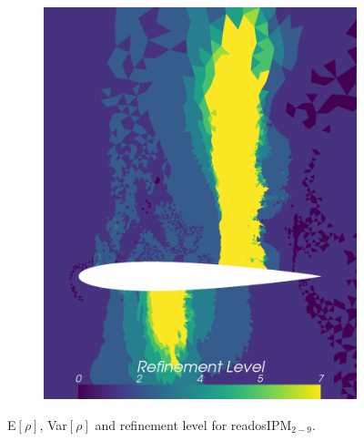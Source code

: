 \begin{figure}[h!]
\begin{subfigure}{0.329\linewidth}
		\includegraphics[width=\linewidth]{figs/Euler1DPlots10/euler2D_nacaCoarse_refadosipm_n2-9_sg2-4_s05_aoa_oneRet_refinementLevel.png}
		\label{fig:sub1}
	\end{subfigure}
	\caption{E$[\rho]$, Var$[\rho]$ and refinement level for readosIPM$_{2-9}$.}
	\label{fig:readosIPMEVar}
\end{figure}


